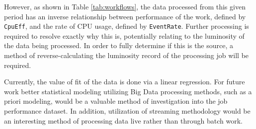 \documentclass[sigconf]{acmart}
\begin{document}
However, as shown in Table \ref{tab:workflows}, the data processed from this given period has an inverse relationship between performance of the work, defined by \texttt{CpuEff}, and the rate of CPU usage, defined by \texttt{EventRate}. Further processing is required to resolve exactly why this is, potentially relating to the luminosity\cite{lumi} of the data being processed. In order to fully determine if this is the source, a method of reverse-calculating the luminosity record of the processing job will be required.

Currently, the value of fit of the data is done via a linear regression. For future work better statistical modeling utilizing Big Data processing methods, such as a priori modeling, would be a valuable method of investigation into the job performance dataset. In addition, utilization of streaming methodology would be an interesting method of processing data live rather than through batch work.


 
\end{document}

